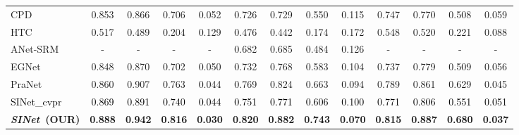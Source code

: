 \documentclass[10pt,journal,compsoc]{IEEEtran}
\newcommand{\Rev}[1]{\textcolor{black}{#1}}
\def\ournewmodel{\emph{SINet}}
\begin{document}
\begin{table*}[t!]
\begin{tabular}{l|cccc||cccc||cccc}
    CPD~\cite{wu2019cascaded}
    &0.853&0.866&0.706&0.052&0.726&0.729&0.550&0.115&0.747&0.770&0.508&0.059\\ 
    HTC~\cite{chen2019hybrid}
    &0.517&0.489&0.204&0.129&0.476&0.442&0.174&0.172&0.548&0.520&0.221&0.088\\
    ANet-SRM~\cite{le2019anabranch}
    & - & - & - & - &0.682&0.685&0.484&0.126& - & - & - & -\\
    EGNet~\cite{zhao2019EGNet}
    &0.848&0.870&0.702&0.050&0.732&0.768&0.583&0.104&0.737&0.779&0.509&0.056\\
    PraNet~\cite{fan2020pranet}     
    &0.860&0.907&0.763&0.044&0.769&0.824&0.663&0.094&0.789&0.861&0.629&0.045\\
    \hline
    \Rev{SINet\_cvpr~\cite{fan2020camouflaged}}     
    & \Rev{0.869} & \Rev{0.891} & \Rev{0.740} & \Rev{0.044} & \Rev{0.751} & \Rev{0.771} & \Rev{0.606} & \Rev{0.100} & \Rev{0.771} & \Rev{0.806} & \Rev{0.551} & \Rev{0.051} \\
    \rowcolor{mygray}\textbf{\ournewmodel~(OUR)}
    & \textbf{0.888} & \textbf{0.942} & \textbf{0.816} & \textbf{0.030}
    & \textbf{0.820} & \textbf{0.882} & \textbf{0.743} & \textbf{0.070}
    & \textbf{0.815} & \textbf{0.887} & \textbf{0.680} & \textbf{0.037} 
    \\ \bottomrule
  \end{tabular}
\end{table*}
\end{document}

